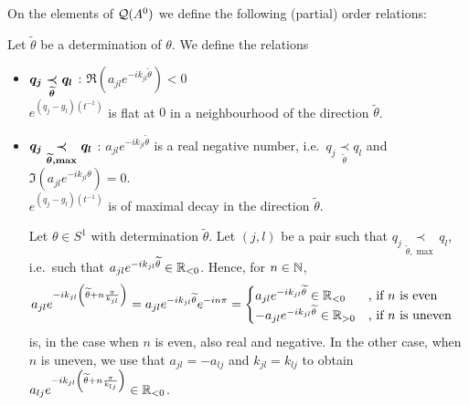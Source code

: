 On the elements of $\cQ(A^0)$ we define the following (partial) order
relations:
\begin{defn}
  Let $\tilde\theta$ be a determination of $\theta$.
  We define the relations
  \begin{itemize}
    \item $\boldmath q_j \underset{\tilde\theta}{\prec} q_l$
      :\Leftrightarrow{} $\Re(a_{jl}e^{-ik_{jl}\tilde\theta})<0$
    \\\Leftrightarrow{} $e^{(q_j-g_l)(t^{-1})}$ is
      flat at $0$ in a neighbourhood of the direction $\tilde\theta$.
    \item $\boldmath q_j \underset{\tilde\theta,\max}{\prec} q_l$
      :\Leftrightarrow{} $a_{jl}e^{-ik_{jl}\tilde\theta}$ is a real negative
      number, i.e.\ $q_j \underset{\tilde\theta}{\prec} q_l$ and
      $\Im(a_{jl}e^{-ik_{jl}\theta})=0$.
      \\\Leftrightarrow{} $e^{(q_j-g_l)(t^{-1})}$ is of maximal
      decay in the direction $\tilde\theta$.
      \begin{comment}
        \Leftrightarrow{} $q_{jl}(t^{-1})\in\R_{<0}$ along $\tilde\theta$.
      \end{comment}
      \begin{s-rem} \label{rem:rotationalSym}
        Let $\theta\in S^1$ with determination $\tilde\theta$.
        Let $(j,l)$ be a pair such that
        $q_j \underset{\tilde\theta,\max}{\prec} q_l$, i.e.\ such that
        $a_{jl}e^{-ik_{jl}\tilde\theta}\in\R_{<0}$.
        Hence, for $n\in\N$,
        \begin{align*}
          a_{jl}e^{-ik_{jl}\left(\tilde\theta+n\frac{\pi}{k_{jl}}\right)}
          &=a_{jl}e^{-ik_{jl}\tilde\theta}e^{-in\pi}
          = \begin{cases}
            a_{jl}e^{-ik_{jl}\tilde\theta}\in\R_{<0}
              & \text{, if $n$ is even}
          \\-a_{jl}e^{-ik_{jl}\tilde\theta}\in\R_{>0}
              & \text{, if $n$ is uneven}
          \end{cases}
        \end{align*}
        is, in the case when $n$ is even, also real and negative. In the other
        case, when $n$ is uneven, we use that $a_{jl}=-a_{lj}$ and
        $k_{jl}=k_{lj}$ to obtain
        $a_{lj}e^{-ik_{jl}\left(\tilde\theta+n\frac{\pi}{k_{lj}}\right)}
        \in\R_{<0}$.


\end{s-rem}
\end{itemize}
\end{defn}
